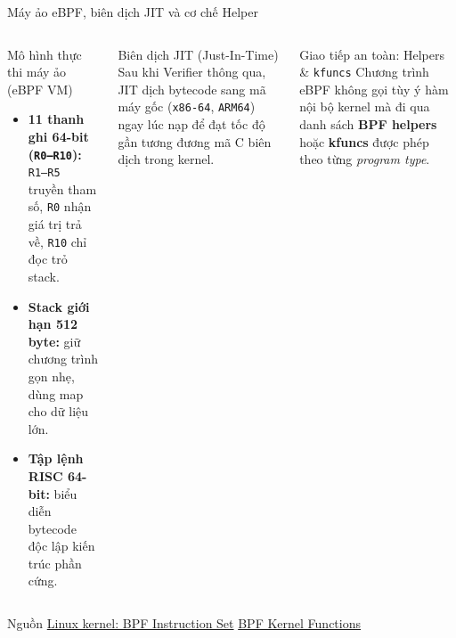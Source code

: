 \begin{frame}{Máy ảo eBPF, biên dịch JIT và cơ chế Helper}
  \begin{columns}[T,onlytextwidth]
    \begin{block}{Mô hình thực thi máy ảo (eBPF VM)}
      \small
      \begin{itemize}
        \item \textbf{11 thanh ghi 64-bit (\texttt{R0--R10}):} \texttt{R1--R5} truyền tham số, \texttt{R0} nhận giá trị trả về, \texttt{R10} chỉ đọc trỏ stack.
        \item \textbf{Stack giới hạn 512 byte:} giữ chương trình gọn nhẹ, dùng map cho dữ liệu lớn.
        \item \textbf{Tập lệnh RISC 64-bit:} biểu diễn bytecode độc lập kiến trúc phần cứng.
      \end{itemize}
    \end{block}

    \begin{block}{Biên dịch JIT (Just-In-Time)}
      \small
      Sau khi Verifier thông qua, JIT dịch bytecode sang mã máy gốc (\texttt{x86-64}, \texttt{ARM64}) ngay lúc nạp để đạt tốc độ gần tương đương mã C biên dịch trong kernel.
    \end{block}
    \begin{block}{Giao tiếp an toàn: Helpers \& \texttt{kfuncs}}
      \small
      Chương trình eBPF không gọi tùy ý hàm nội bộ kernel mà đi qua danh sách \textbf{BPF helpers} hoặc \textbf{kfuncs} được phép theo từng \textsl{program type}.
    \end{block}
  \end{columns}
  \medskip
  {\scriptsize Nguồn \href{https://docs.kernel.org/bpf/standardization/instruction-set.html}{Linux kernel: BPF Instruction Set} \quad \textbar \quad \href{https://docs.kernel.org/bpf/kfuncs.html}{BPF Kernel Functions}}
\end{frame}


